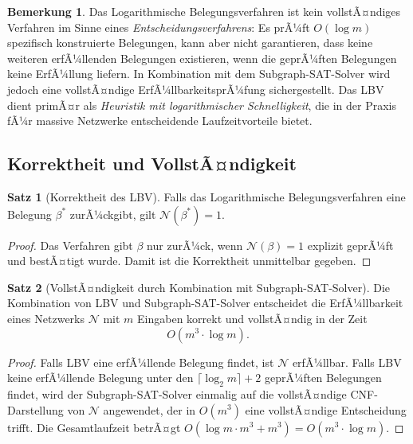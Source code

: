 ﻿\documentclass[a4paper,12pt]{article}
\theoremstyle{definition}
\newtheorem{satz}{Satz}
\newtheorem{bemerkung}{Bemerkung}
\begin{document}
\begin{bemerkung}
	Das Logarithmische Belegungsverfahren ist kein vollstÃ¤ndiges Verfahren im Sinne eines
	\emph{Entscheidungsverfahrens}: Es prÃ¼ft $O(\log m)$ spezifisch konstruierte Belegungen,
	kann aber nicht garantieren, dass keine weiteren erfÃ¼llenden Belegungen existieren, wenn
	die geprÃ¼ften Belegungen keine ErfÃ¼llung liefern. In Kombination mit dem Subgraph-SAT-Solver
	wird jedoch eine vollstÃ¤ndige ErfÃ¼llbarkeitsprÃ¼fung sichergestellt. Das LBV dient primÃ¤r
	als \emph{Heuristik mit logarithmischer Schnelligkeit}, die in der Praxis fÃ¼r massive
	Netzwerke entscheidende Laufzeitvorteile bietet.
\end{bemerkung}

\subsection{Korrektheit und VollstÃ¤ndigkeit}

\begin{satz}[Korrektheit des LBV]
	Falls das Logarithmische Belegungsverfahren eine Belegung $\beta^*$ zurÃ¼ckgibt, gilt
	$\mathcal{N}(\beta^*) = 1$.
\end{satz}

\begin{proof}
	Das Verfahren gibt $\beta$ nur zurÃ¼ck, wenn $\mathcal{N}(\beta) = 1$ explizit geprÃ¼ft
	und bestÃ¤tigt wurde. Damit ist die Korrektheit unmittelbar gegeben.
\end{proof}

\begin{satz}[VollstÃ¤ndigkeit durch Kombination mit Subgraph-SAT-Solver]
	Die Kombination von LBV und Subgraph-SAT-Solver entscheidet die ErfÃ¼llbarkeit eines
	Netzwerks $\mathcal{N}$ mit $m$ Eingaben korrekt und vollstÃ¤ndig in der Zeit
	\[
	O\!\left(m^3 \cdot \log m\right).
	\]
\end{satz}

\begin{proof}
	Falls LBV eine erfÃ¼llende Belegung findet, ist $\mathcal{N}$ erfÃ¼llbar. Falls LBV keine
	erfÃ¼llende Belegung unter den $\lceil \log_2 m \rceil + 2$ geprÃ¼ften Belegungen findet,
	wird der Subgraph-SAT-Solver einmalig auf die vollstÃ¤ndige CNF-Darstellung von $\mathcal{N}$
	angewendet, der in $O(m^3)$ eine vollstÃ¤ndige Entscheidung trifft. Die Gesamtlaufzeit
	betrÃ¤gt $O(\log m \cdot m^3 + m^3) = O(m^3 \cdot \log m)$.
\end{proof}

\end{document}
